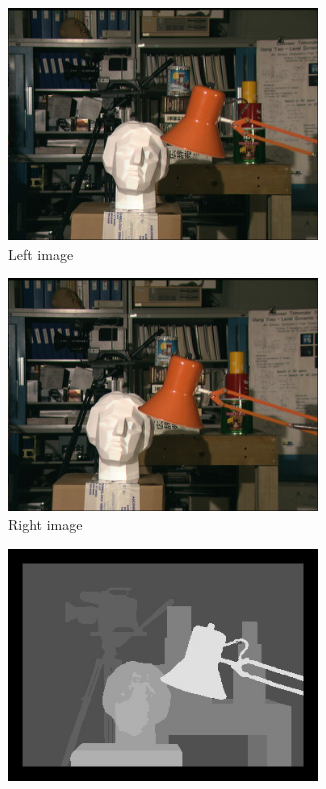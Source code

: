 \begin{figure}[ht]
  \centering
  \begin{subfigure}[t]{0.3\textwidth}
    \centering\includegraphics[width=0.9\textwidth]{figures/tsul.jpg}
    \caption{Left image \label{fig:aptsu_l}}
  \end{subfigure}\hspace{0.5cm}
  \begin{subfigure}[t]{0.3\textwidth}
    \centering\includegraphics[width=0.9\textwidth]{figures/tsur}
    \caption{Right image\label{fig:aptsu_r}}
  \end{subfigure}\hspace{0.5cm}
  \begin{subfigure}[t]{0.3\textwidth}
    \centering\includegraphics[width=0.9\textwidth]{figures/tsu_gt}

\end{subfigure}
\end{figure}
